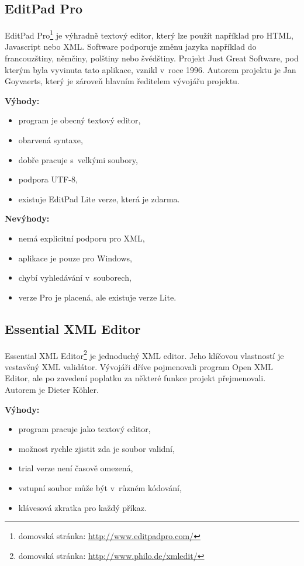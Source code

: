         \subsection{EditPad Pro}
            EditPad Pro\footnote{domovská stránka: \url{http://www.editpadpro.com/}} je výhradně textový editor, který lze použít například pro HTML, Javascript nebo XML. Software podporuje změnu jazyka například do francouzštiny, němčiny, polštiny nebo švédštiny. Projekt Just Great Software, pod kterým byla vyvinuta tato aplikace, vznikl v~roce 1996. Autorem projektu je Jan Goyvaerts, který je zároveň hlavním ředitelem vývojářu projektu.

            \textbf{Výhody:}
                \begin{itemize}
                    \item program je obecný textový editor,
                    \item obarvená syntaxe,
                    \item dobře pracuje s~velkými soubory,
                    \item podpora UTF-8,
                    \item existuje EditPad Lite verze, která je zdarma.
                \end{itemize}
                
            \textbf{Nevýhody:}
                \begin{itemize}
                    \item nemá explicitní podporu pro XML,
                    \item aplikace je pouze pro Windows,
                    \item chybí vyhledávání v~souborech,
                    \item verze Pro je placená, ale existuje verze Lite.
                \end{itemize}
                
        \subsection{Essential XML Editor}
            Essential XML Editor\footnote{domovská stránka: \url{http://www.philo.de/xmledit/}} je jednoduchý XML editor. Jeho klíčovou vlastností je vestavěný XML validátor. Vývojáři dříve pojmenovali program Open XML Editor, ale po zavedení poplatku za některé funkce projekt přejmenovali. Autorem je Dieter Köhler. 
            
            \textbf{Výhody:}
                \begin{itemize}
                    \item program pracuje jako textový editor,
                    \item možnost rychle zjistit zda je soubor validní,
                    \item trial verze není časově omezená,
                    \item vstupní soubor může být v~různém kódování,
                    \item klávesová zkratka pro každý příkaz.
                \end{itemize}
                
